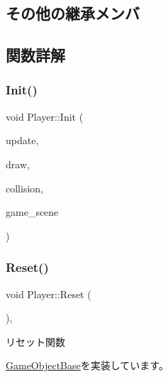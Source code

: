 \subsection*{その他の継承メンバ}


\subsection{関数詳解}
\mbox{\label{class_player_a171167a4b1a6dddbe94b8f3c6f7462c4}} 
\subsubsection{\texorpdfstring{Init()}{Init()}}
{\footnotesize\ttfamily void Player\+::\+Init (\begin{DoxyParamCaption}\item[{\mbox{\hyperlink{class_update_base}{Update\+Base}} $\ast$}]{update,  }\item[{\mbox{\hyperlink{class_draw_base}{Draw\+Base}} $\ast$}]{draw,  }\item[{\mbox{\hyperlink{class_collision_base}{Collision\+Base}} $\ast$}]{collision,  }\item[{\mbox{\hyperlink{class_game_scene}{Game\+Scene}} $\ast$}]{game\+\_\+scene }\end{DoxyParamCaption})}

\mbox{\label{class_player_a457153d0edd58932e37e1356f5fe5fed}} 
\subsubsection{\texorpdfstring{Reset()}{Reset()}}
{\footnotesize\ttfamily void Player\+::\+Reset (\begin{DoxyParamCaption}{ }\end{DoxyParamCaption})\hspace{0.3cm}{\ttfamily [override]}, {\ttfamily [virtual]}}



リセット関数 



\mbox{\hyperlink{class_game_object_base_a85c59554f734bcb09f1a1e18d9517dce}{Game\+Object\+Base}}を実装しています。

\mbox{\label{class_player_a7455a83ac23d2f5e0cce0ddd7d92db0c}} 
